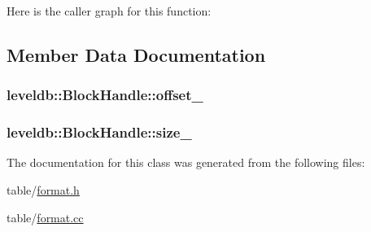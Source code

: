 Here is the caller graph for this function\-:




\subsection{Member Data Documentation}
\hypertarget{classleveldb_1_1_block_handle_ae235db13a2732b6c6f9c5af7bfecdbd1}{
\subsubsection[{offset\-\_\-}]{ leveldb\-::\-Block\-Handle\-::offset\-\_\-\hspace{0.3cm}{\ttfamily [private]}}}\label{classleveldb_1_1_block_handle_ae235db13a2732b6c6f9c5af7bfecdbd1}
\hypertarget{classleveldb_1_1_block_handle_a2cbf22e0eb41dbc60d2b4396b85cde7e}{
\subsubsection[{size\-\_\-}]{ leveldb\-::\-Block\-Handle\-::size\-\_\-\hspace{0.3cm}{\ttfamily [private]}}}\label{classleveldb_1_1_block_handle_a2cbf22e0eb41dbc60d2b4396b85cde7e}


The documentation for this class was generated from the following files\-:\begin{DoxyCompactItemize}
\item 
table/\hyperlink{format_8h}{format.\-h}\item 
table/\hyperlink{format_8cc}{format.\-cc}\end{DoxyCompactItemize}
